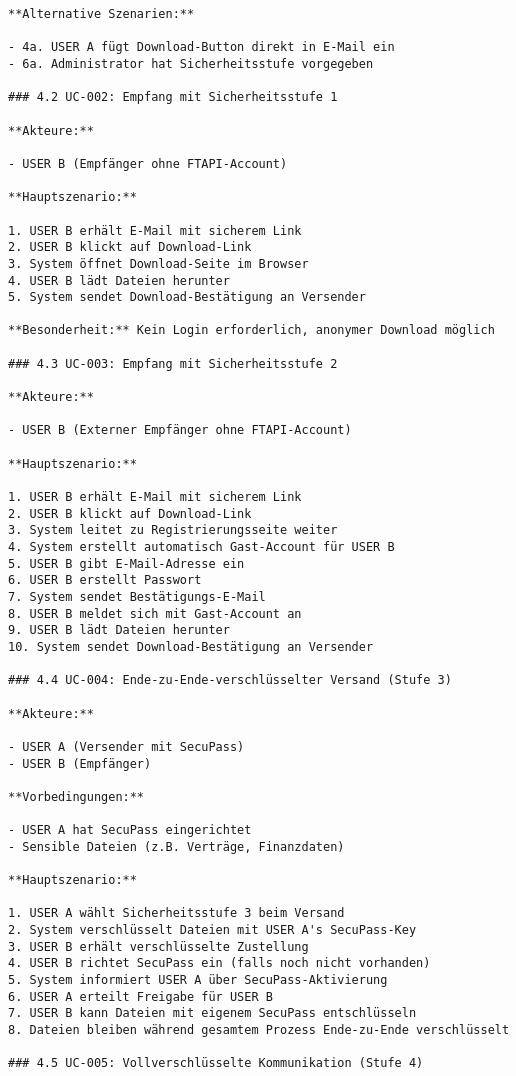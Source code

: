 \begin{verbatim}
**Alternative Szenarien:**

- 4a. USER A fügt Download-Button direkt in E-Mail ein
- 6a. Administrator hat Sicherheitsstufe vorgegeben

### 4.2 UC-002: Empfang mit Sicherheitsstufe 1

**Akteure:**

- USER B (Empfänger ohne FTAPI-Account)

**Hauptszenario:**

1. USER B erhält E-Mail mit sicherem Link
2. USER B klickt auf Download-Link
3. System öffnet Download-Seite im Browser
4. USER B lädt Dateien herunter
5. System sendet Download-Bestätigung an Versender

**Besonderheit:** Kein Login erforderlich, anonymer Download möglich

### 4.3 UC-003: Empfang mit Sicherheitsstufe 2

**Akteure:**

- USER B (Externer Empfänger ohne FTAPI-Account)

**Hauptszenario:**

1. USER B erhält E-Mail mit sicherem Link
2. USER B klickt auf Download-Link
3. System leitet zu Registrierungsseite weiter
4. System erstellt automatisch Gast-Account für USER B
5. USER B gibt E-Mail-Adresse ein
6. USER B erstellt Passwort
7. System sendet Bestätigungs-E-Mail
8. USER B meldet sich mit Gast-Account an
9. USER B lädt Dateien herunter
10. System sendet Download-Bestätigung an Versender

### 4.4 UC-004: Ende-zu-Ende-verschlüsselter Versand (Stufe 3)

**Akteure:**

- USER A (Versender mit SecuPass)
- USER B (Empfänger)

**Vorbedingungen:**

- USER A hat SecuPass eingerichtet
- Sensible Dateien (z.B. Verträge, Finanzdaten)

**Hauptszenario:**

1. USER A wählt Sicherheitsstufe 3 beim Versand
2. System verschlüsselt Dateien mit USER A's SecuPass-Key
3. USER B erhält verschlüsselte Zustellung
4. USER B richtet SecuPass ein (falls noch nicht vorhanden)
5. System informiert USER A über SecuPass-Aktivierung
6. USER A erteilt Freigabe für USER B
7. USER B kann Dateien mit eigenem SecuPass entschlüsseln
8. Dateien bleiben während gesamtem Prozess Ende-zu-Ende verschlüsselt

### 4.5 UC-005: Vollverschlüsselte Kommunikation (Stufe 4)


\end{verbatim}
